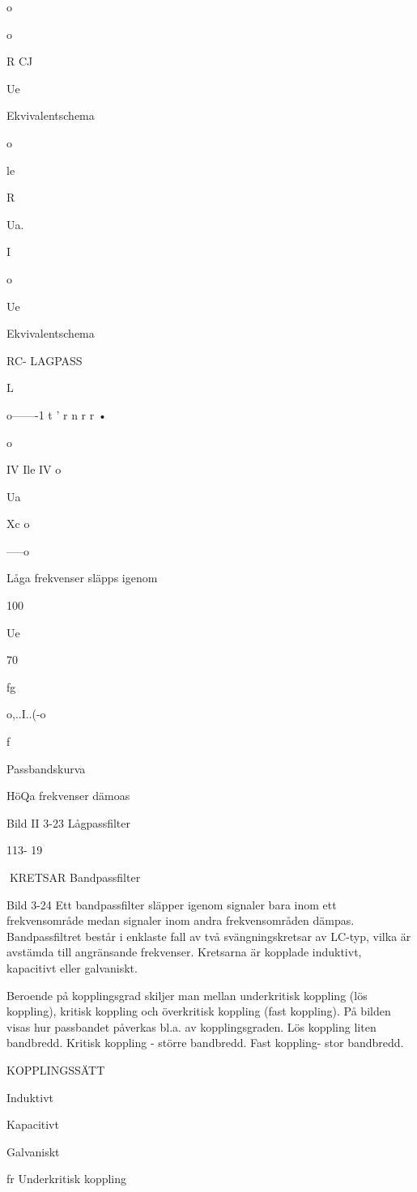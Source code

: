 \documentclass[a4paper,twoside,twocolumn,openright]{book}
\begin{document}
{{{{{{{o

o

R
CJ

Ue

Ekvivalentschema

o

le

R

Ua.

I

o

Ue

Ekvivalentschema

RC- LAGPASS

L

o-------1 t ' r n r r •

o

IV Ile IV
o

Ua

Xc
o

-----o

Låga frekvenser släpps igenom

100

Ue

70

fg

o,..I..(-o

f

Passbandskurva

HöQa frekvenser dämoas

Bild II 3-23 Lågpassfilter

113- 19

KRETSAR
Bandpassfilter

Bild 3-24
Ett bandpassfilter släpper igenom signaler
bara inom ett frekvensområde medan signaler inom andra frekvensområden dämpas.
Bandpassfiltret består i enklaste fall av
två svängningskretsar av LC-typ, vilka är
avstämda till angränsande frekvenser. Kretsarna är kopplade induktivt, kapacitivt eller
galvaniskt.

Beroende på kopplingsgrad skiljer man
mellan underkritisk koppling (lös koppling),
kritisk koppling och överkritisk koppling (fast
koppling).
På bilden visas hur passbandet påverkas
bl.a. av kopplingsgraden. Lös koppling liten bandbredd. Kritisk koppling - större
bandbredd. Fast koppling- stor bandbredd.

KOPPLINGSSÄTT

Induktivt

Kapacitivt

Galvaniskt

fr
Underkritisk koppling

}}}}}}}
\end{document}
